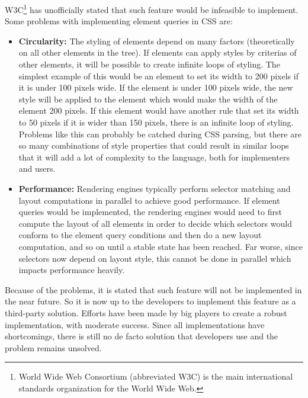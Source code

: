 \documentclass[oneside,a4paper,11pt]{kth-mag}
\begin{document}
W3C\footnote{World Wide Web Consortium (abbreviated W3C) is the main international standards organization for the World Wide Web.} has unofficially stated that such feature would be infeasible to implement. Some problems with implementing element queries in CSS are:
\begin{itemize}
    \item \textbf{Circularity:} The styling of elements depend on many factors (theoretically on all other elements in the tree). If elements can apply styles by criterias of other elements, it will be possible to create infinite loops of styling. The simplest example of this would be an element to set its width to 200 pixels if it is under 100 pixels wide. If the element is under 100 pixels wide, the new style will be applied to the element which would make the width of the element 200 pixels. If this element would have another rule that set its width to 50 pixels if it is wider than 150 pixels, there is an infinite loop of styling. Problems like this can probably be catched during CSS parsing, but there are so many combinations of style properties that could result in similar loops that it will add a lot of complexity to the language, both for implementers and users.
    \item \textbf{Performance:} Rendering engines typically perform selector matching and layout computations in parallel to achieve good performance. If element queries would be implemented, the rendering engines would need to first compute the layout of all elements in order to decide which selectors would conform to the element query conditions and then do a new layout computation, and so on until a stable state has been reached. Far worse, since selectors now depend on layout style, this cannot be done in parallel which impacts performance heavily.
\end{itemize}
Because of the problems, it is stated that such feature will not be implemented in the near future. So it is now up to the developers to implement this feature as a third-party solution. Efforts have been made by big players to create a robust implementation, with moderate success. Since all implementations have shortcomings, there is still no de facto solution that developers use and the problem remains unsolved.
\end{document}
